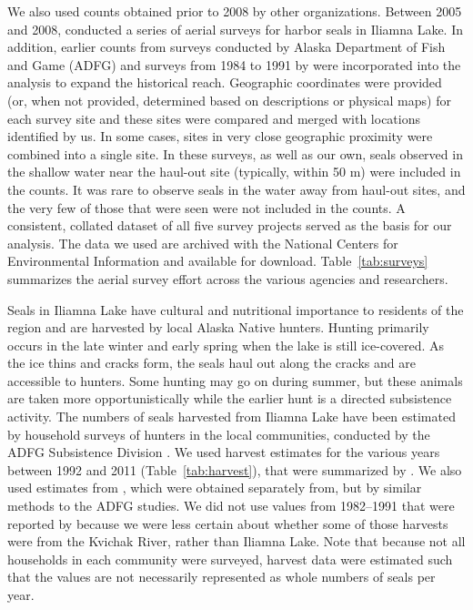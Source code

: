 \documentclass[12pt, titlepage]{article}\usepackage[]{graphicx}\usepackage[]{color}
\begin{document}
We also used counts obtained prior to 2008 by other organizations. Between 2005 and 2008, \citet{ABR:wild:2011} conducted a series of aerial surveys for harbor seals in Iliamna Lake. In addition, earlier counts from surveys conducted by Alaska Department of Fish and Game (ADFG) \citep{Smal:harb:2001} and surveys from 1984 to 1991 by \citet{Math:Klin:harb:1992} were incorporated into the analysis to expand the historical reach. Geographic coordinates were provided (or, when not provided, determined based on descriptions or physical maps) for each survey site and these sites were compared and merged with locations identified by us. In some cases, sites in very close geographic proximity were combined into a single site. In these surveys, as well as our own, seals  observed in the shallow water near the haul-out site (typically, within 50 m) were included in the counts. It was rare to observe seals in the water away from haul-out sites, and the very few of those that were seen were not included in the counts. A consistent, collated dataset of all five survey projects served as the basis for our analysis. The data we used are archived with the National Centers for Environmental Information \citep{With:Lond:Yano:Bove:aeri:2014} and available for download. Table~\ref{tab:surveys} summarizes the aerial survey effort across the various agencies and researchers.



Seals in Iliamna Lake have cultural and nutritional importance to residents of the region \citep{Burn:Van:With:Hole:Asko:inte:2016} and are harvested by local Alaska Native hunters. Hunting primarily occurs in the late winter and early spring when the lake is still ice-covered. As the ice thins and cracks form, the seals haul out along the cracks and are accessible to hunters. Some hunting may go on during summer, but these animals are taken more opportunistically while the earlier hunt is a directed subsistence activity. The numbers of seals harvested from Iliamna Lake have been estimated by household surveys of hunters in the local communities, conducted by the ADFG Subsistence Division \citep{Fall:Hole:Davi:Krie:Kost:subs:2006,Krie:Hole:Kost:subs:2009,Burn:Van:With:Hole:Asko:inte:2016}. We used harvest estimates for the various years between 1992 and 2011 (Table~\ref{tab:harvest}), that were summarized by \citet{Burn:Van:With:Hole:Asko:inte:2016}. We also used estimates from \citet{Burn:Chyt:Gome:Asko:inte:2011}, which were obtained separately from, but by similar methods to the ADFG studies. We did not use values from 1982--1991 that were reported by \citet{Burn:Van:With:Hole:Asko:inte:2016} because we were less certain about whether some of those harvests were from the Kvichak River, rather than Iliamna Lake. Note that because not all households in each community were surveyed, harvest data were estimated such that the values are not necessarily represented as whole numbers of seals per year. 
\end{document}
